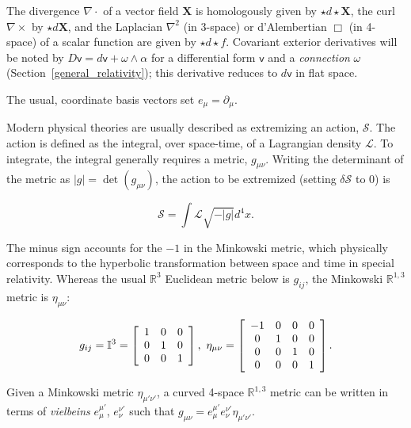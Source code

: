 The divergence $\nabla \cdot$ of a vector field $\textbf{X}$ is homologously given by $\star d \star \textbf{X}$, the curl $\nabla \times$ by $\star d \textbf{X}$, and the Laplacian $\nabla^2$ (in 3-space) or d'Alembertian $\Box$ (in 4-space) of a scalar function are given by $\star d \star f$.
Covariant exterior derivatives will be noted by $D \textsf{v} = d \textsf{v} + \omega \wedge \alpha$ for a differential form $\textsf{v}$ and a \textit{connection} $\omega$ (Section~\ref{general_relativity}); this derivative reduces to $d\textsf{v}$ in flat space.

The usual, coordinate basis vectors set $e_\mu = \partial_\mu$.

Modern physical theories are usually described as extremizing an action, $\mathcal{S}$. 
The action is defined as the integral, over space-time, of a Lagrangian density $\mathcal{L}$. 
To integrate, the integral generally requires a metric, $g_{\mu\nu}$.
Writing the determinant of the metric as $|g| = \det(g_{\mu\nu})$, the action to be extremized (setting $\delta \mathcal{S}$ to 0) is

\begin{equation}
\mathcal{S} = \int \mathcal{L} \sqrt{-|g|} d^4 x.
\end{equation} 

The minus sign accounts for the $-1$ in the Minkowski metric, which physically corresponds to the hyperbolic transformation between space and time in special relativity.
Whereas the usual $\mathbb{R}^3$ Euclidean metric below is $g_{ij}$, the Minkowski $\mathbb{R}^{1,3}$ metric is $\eta_{\mu\nu}$:

\begin{eqnarray}
g_{ij} = \mathbb{I}^3 = 
\left[
\begin{array}{ccc}
1 & 0 & 0 \\
0 & 1 & 0 \\
0 & 0 & 1
\end{array} \right],
\textup{ }
\eta_{\mu\nu} =
\left[
\begin{array}{cccc}
-1 & 0 & 0 & 0\\
0 & 1 & 0 & 0 \\
0 & 0 & 1 & 0\\
0 & 0 & 0 & 1
\end{array} \right].
\end{eqnarray}

Given a Minkowski metric $\eta_{\mu' \nu'}$, a curved 4-space $\mathbb{R}^{1,3}$ metric can be written in terms of \textit{vielbeins} $e^{\mu'}_{\mu}$, $e^{\nu'}_{\nu}$ such that $g_{\mu\nu} = e^{\mu'}_{\mu} e^{\nu'}_{\nu} \eta_{\mu' \nu'}$.


